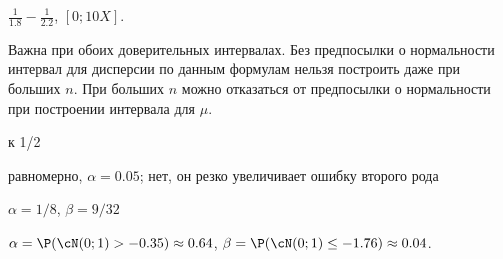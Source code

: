 \begin{solution}{19.13}

\end{solution}
\begin{solution}{19.14}

\end{solution}
\begin{solution}{19.15}

\end{solution}
\begin{solution}{20.1}
  $\frac{1}{1.8} - \frac{1}{2.2}$, $[0;10X]$.
\end{solution}
\begin{solution}{20.2}
\end{solution}
\begin{solution}{20.3}
\end{solution}
\begin{solution}{20.4}
\end{solution}
\begin{solution}{20.5}
\end{solution}
\begin{solution}{20.6}
Важна при обоих доверительных интервалах. Без предпосылки о нормальности интервал для дисперсии по данным формулам нельзя построить даже при больших $n$. При больших $n$ можно отказаться от предпосылки о нормальности при построении интервала для $\mu$.
\end{solution}
\begin{solution}{20.7}
\end{solution}
\begin{solution}{21.1}
к 1/2
\end{solution}
\begin{solution}{21.2}
  равномерно, $\alpha=0.05$; нет, он резко увеличивает ошибку второго рода
\end{solution}
\begin{solution}{21.3}
  $\alpha = 1/8$, $\beta = 9/32$
\end{solution}
\begin{solution}{21.4}
  $\alpha = \P(\cN(0;1) > -0.35) \approx 0.64$, $\beta = \P(\cN(0;1) \leq -1.76) \approx 0.04$.
\end{solution}
\begin{solution}{21.5}
\end{solution}
\begin{solution}{21.6}
\end{solution}
\begin{solution}{21.7}

\end{solution}
